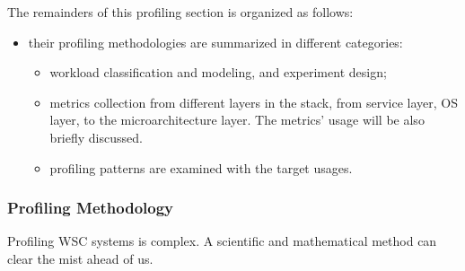 The remainders of this profiling section is organized as follows:
\begin{itemize}
  \item their profiling methodologies are summarized in different categories:
  \begin{itemize}
    \item workload classification and modeling, and experiment design;
    \item metrics collection from different layers in the stack, from service layer, OS layer, to the microarchitecture layer. The metrics' usage will be also briefly discussed.
    \item profiling patterns are examined with the target usages.
  \end{itemize}
\end{itemize}

\subsubsection{Profiling Methodology}

Profiling WSC systems is complex. A scientific and mathematical method can clear the mist ahead of us.

